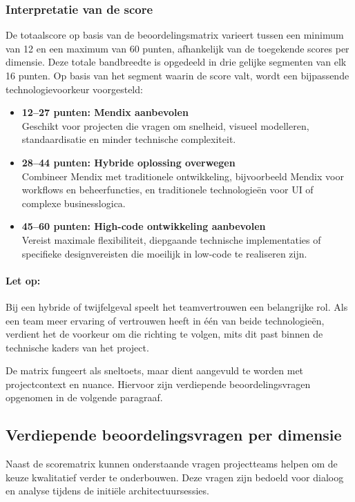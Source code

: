 \subsubsection{Interpretatie van de score}
De totaalscore op basis van de beoordelingsmatrix varieert tussen een minimum van 12 en een maximum van 60 punten, afhankelijk van de toegekende scores per dimensie. Deze totale bandbreedte is opgedeeld in drie gelijke segmenten van elk 16 punten. Op basis van het segment waarin de score valt, wordt een bijpassende technologievoorkeur voorgesteld:
\begin{itemize}
    \item \textbf{12–27 punten: Mendix aanbevolen} \\
    Geschikt voor projecten die vragen om snelheid, visueel modelleren, standaardisatie en minder technische complexiteit.
    
    \item \textbf{28–44 punten: Hybride oplossing overwegen} \\
    Combineer Mendix met traditionele ontwikkeling, bijvoorbeeld Mendix voor workflows en beheerfuncties, en traditionele technologieën voor UI of complexe businesslogica.
    
    \item \textbf{45–60 punten: High-code ontwikkeling aanbevolen} \\
    Vereist maximale flexibiliteit, diepgaande technische implementaties of specifieke designvereisten die moeilijk in low-code te realiseren zijn.
\end{itemize}

\paragraph{Let op:} Bij een hybride of twijfelgeval speelt het teamvertrouwen een belangrijke rol. Als een team meer ervaring of vertrouwen heeft in één van beide technologieën, verdient het de voorkeur om die richting te volgen, mits dit past binnen de technische kaders van het project.

De matrix fungeert als sneltoets, maar dient aangevuld te worden met projectcontext en nuance. Hiervoor zijn verdiepende beoordelingsvragen opgenomen in de volgende paragraaf.

\subsection{Verdiepende beoordelingsvragen per dimensie}
Naast de scorematrix kunnen onderstaande vragen projectteams helpen om de keuze kwalitatief verder te onderbouwen. Deze vragen zijn bedoeld voor dialoog en analyse tijdens de initiële architectuursessies.

